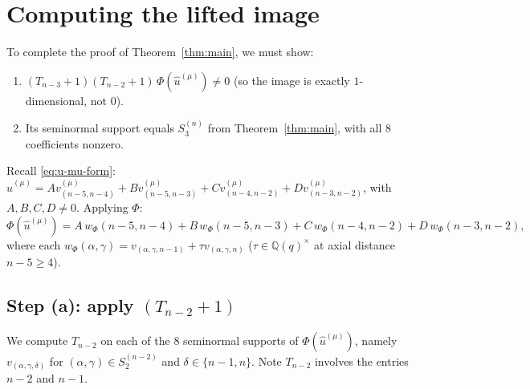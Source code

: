 \documentclass[11pt]{article}
\theoremstyle{definition}
\begin{document}
\section{Computing the lifted image}\label{sec:lift}

To complete the proof of Theorem~\ref{thm:main}, we must show:
\begin{enumerate}[leftmargin=2em,topsep=0.3em,itemsep=0.2em]
\item $(T_{n-3}{+}1)(T_{n-2}{+}1)\,\Phi(\hat u^{(\mu)})\ne 0$
(so the image is exactly $1$-dimensional, not $0$).
\item Its seminormal support equals $S_3^{(n)}$ from
Theorem~\ref{thm:main}, with all $8$ coefficients nonzero.
\end{enumerate}

Recall \eqref{eq:u-mu-form}: $\hat u^{(\mu)}=
A v_{(n-5,n-4)}^{(\mu)}+B v_{(n-5,n-3)}^{(\mu)}
+C v_{(n-4,n-2)}^{(\mu)}+D v_{(n-3,n-2)}^{(\mu)}$, with
$A,B,C,D\ne 0$.  Applying $\Phi$:
\begin{equation}\label{eq:Phi-u-mu}
   \Phi(\hat u^{(\mu)})
   = A\,w_\Phi(n{-}5,n{-}4)+B\,w_\Phi(n{-}5,n{-}3)
   + C\,w_\Phi(n{-}4,n{-}2)+D\,w_\Phi(n{-}3,n{-}2),
\end{equation}
where each $w_\Phi(\alpha,\gamma)=v_{(\alpha,\gamma,n-1)}
+\tau v_{(\alpha,\gamma,n)}$ ($\tau\in\mathbb{Q}(q)^\times$ at axial
distance $n-5\ge 4$).

\subsection{Step (a): apply $(T_{n-2}{+}1)$}

We compute $T_{n-2}$ on each of the $8$ seminormal supports of
$\Phi(\hat u^{(\mu)})$, namely $v_{(\alpha,\gamma,\delta)}$ for
$(\alpha,\gamma)\in S_2^{(n-2)}$ and $\delta\in\{n-1,n\}$.  Note
$T_{n-2}$ involves the entries $n-2$ and $n-1$.
\end{document}
